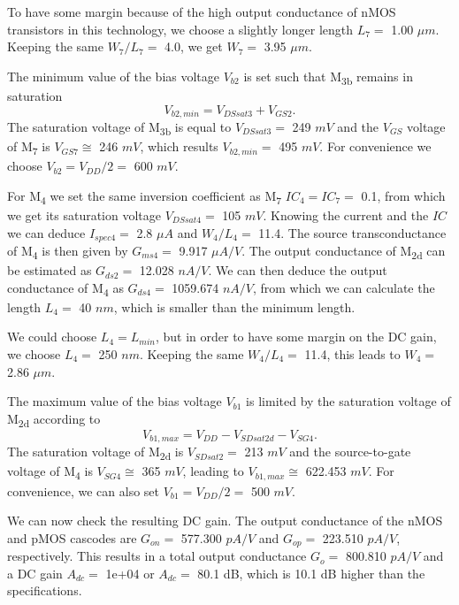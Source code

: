 \documentclass[
  a4paper,
  DIV=11,
  numbers=noendperiod]{scrreprt}
\begin{document}
To have some margin because of the high output conductance of nMOS
transistors in this technology, we choose a slightly longer length
\(L_7 =\) 1.00 \(\mu m\). Keeping the same \(W_7/L_7 =\) 4.0, we get
\(W_7 =\) 3.95 \(\mu m\).

The minimum value of the bias voltage \(V_{b2}\) is set such that
M\textsubscript{3b} remains in saturation \begin{equation}
  V_{b2,min} = V_{DSsat3} + V_{GS2}.
\end{equation} The saturation voltage of M\textsubscript{3b} is equal to
\(V_{DSsat3} =\) 249 \(mV\) and the \(V_{GS}\) voltage of
M\textsubscript{7} is \(V_{GS7} \cong\) 246 \(mV\), which results
\(V_{b2,min} =\) 495 \(mV\). For convenience we choose
\(V_{b2} = V_{DD}/2 =\) 600 \(mV\).

For M\textsubscript{4} we set the same inversion coefficient as
M\textsubscript{7} \(IC_4 = IC_7 =\) 0.1, from which we get its
saturation voltage \(V_{DSsat4} =\) 105 \(mV\). Knowing the current and
the \(IC\) we can deduce \(I_{spec4} =\) 2.8 \(\mu A\) and \(W_4/L_4 =\)
11.4. The source transconductance of M\textsubscript{4} is then given by
\(G_{ms4} =\) 9.917 \(\mu A/V\). The output conductance of
M\textsubscript{2d} can be estimated as \(G_{ds2} =\) 12.028 \(nA/V\).
We can then deduce the output conductance of M\textsubscript{4} as
\(G_{ds4} =\) 1059.674 \(nA/V\), from which we can calculate the length
\(L_4 =\) 40 \(nm\), which is smaller than the minimum length.

We could choose \(L_4 = L_{min}\), but in order to have some margin on
the DC gain, we choose \(L_4 =\) 250 \(nm\). Keeping the same
\(W_4/L_4 =\) 11.4, this leads to \(W_4 =\) 2.86 \(\mu m\).

The maximum value of the bias voltage \(V_{b1}\) is limited by the
saturation voltage of M\textsubscript{2d} according to
\begin{equation}\label{eqn:}
  V_{b1,max} = V_{DD} - V_{SDsat2d} - V_{SG4}.
\end{equation} The saturation voltage of M\textsubscript{2d} is
\(V_{SDsat2} =\) 213 \(mV\) and the source-to-gate voltage of
M\textsubscript{4} is \(V_{SG4} \cong\) 365 \(mV\), leading to
\(V_{b1,max} \cong\) 622.453 \(mV\). For convenience, we can also set
\(V_{b1} = V_{DD}/2 =\) 500 \(mV\).

We can now check the resulting DC gain. The output conductance of the
nMOS and pMOS cascodes are \(G_{on} =\) 577.300 \(pA/V\) and
\(G_{op} =\) 223.510 \(pA/V\), respectively. This results in a total
output conductance \(G_o =\) 800.810 \(pA/V\) and a DC gain \(A_{dc} =\)
1e+04 or \(A_{dc} =\) 80.1 dB, which is 10.1 dB higher than the
specifications.
\end{document}
